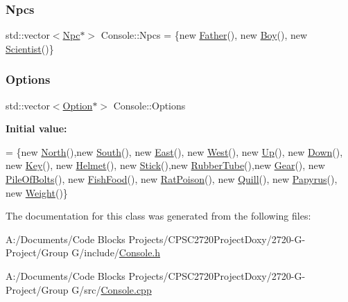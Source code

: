 \mbox{\label{class_console_aaaf6dabe3be6d08c6d24df8a498b20a4}} 
\subsubsection{\texorpdfstring{Npcs}{Npcs}}
{\footnotesize\ttfamily std\+::vector$<$\mbox{\hyperlink{class_npc}{Npc}}$\ast$$>$ Console\+::\+Npcs = \{new \mbox{\hyperlink{class_father}{Father}}(), new \mbox{\hyperlink{class_boy}{Boy}}(), new \mbox{\hyperlink{class_scientist}{Scientist}}()\}}

\mbox{\label{class_console_a42e89a153b1782cc15d6b4cb50434802}} 
\subsubsection{\texorpdfstring{Options}{Options}}
{\footnotesize\ttfamily std\+::vector$<$\mbox{\hyperlink{class_option}{Option}}$\ast$$>$ Console\+::\+Options}

{\bfseries Initial value\+:}
\begin{DoxyCode}
= \{\textcolor{keyword}{new} \mbox{\hyperlink{class_north}{North}}(),\textcolor{keyword}{new} \mbox{\hyperlink{class_south}{South}}(), \textcolor{keyword}{new} \mbox{\hyperlink{class_east}{East}}(), \textcolor{keyword}{new} \mbox{\hyperlink{class_west}{West}}(), \textcolor{keyword}{new} \mbox{\hyperlink{class_up}{Up}}(), \textcolor{keyword}{new} 
      \mbox{\hyperlink{class_down}{Down}}(),
            \textcolor{keyword}{new} \mbox{\hyperlink{class_key}{Key}}(), \textcolor{keyword}{new} \mbox{\hyperlink{class_helmet}{Helmet}}(), \textcolor{keyword}{new} \mbox{\hyperlink{class_stick}{Stick}}(),\textcolor{keyword}{new} \mbox{\hyperlink{class_rubber_tube}{RubberTube}}(),\textcolor{keyword}{new} 
      \mbox{\hyperlink{class_gear}{Gear}}(), \textcolor{keyword}{new} \mbox{\hyperlink{class_pile_of_bolts}{PileOfBolts}}(),
            \textcolor{keyword}{new} \mbox{\hyperlink{class_fish_food}{FishFood}}(), \textcolor{keyword}{new} \mbox{\hyperlink{class_rat_poison}{RatPoison}}(), \textcolor{keyword}{new} \mbox{\hyperlink{class_quill}{Quill}}(), \textcolor{keyword}{new} 
      \mbox{\hyperlink{class_papyrus}{Papyrus}}(), \textcolor{keyword}{new} \mbox{\hyperlink{class_weight}{Weight}}()\}
\end{DoxyCode}


The documentation for this class was generated from the following files\+:\begin{DoxyCompactItemize}
\item 
A\+:/\+Documents/\+Code Blocks Projects/\+C\+P\+S\+C2720\+Project\+Doxy/2720-\/\+G-\/\+Project/\+Group G/include/\mbox{\hyperlink{_console_8h}{Console.\+h}}\item 
A\+:/\+Documents/\+Code Blocks Projects/\+C\+P\+S\+C2720\+Project\+Doxy/2720-\/\+G-\/\+Project/\+Group G/src/\mbox{\hyperlink{_console_8cpp}{Console.\+cpp}}\end{DoxyCompactItemize}
